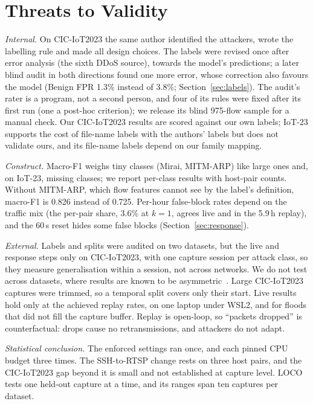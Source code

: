 \section{Threats to Validity}\label{sec:threats}

\emph{Internal.} On CIC-IoT2023 the same author identified the attackers, wrote the labelling rule and made all design choices. The labels were revised once after error analysis (the sixth DDoS source), towards the model's predictions; a later blind audit in both directions found one more error, whose correction also favours the model (Benign FPR 1.3\% instead of 3.8\%; Section~\ref{sec:labels}). The audit's rater is a program, not a second person, and four of its rules were fixed after its first run (one a post-hoc criterion); we release its blind 975-flow sample for a manual check. Our CIC-IoT2023 results are scored against our own labels; IoT-23 supports the cost of file-name labels with the authors' labels but does not validate ours, and its file-name labels depend on our family mapping.

\emph{Construct.} Macro-F1 weighs tiny classes (Mirai, MITM-ARP) like large ones and, on IoT-23, missing classes; we report per-class results with host-pair counts. Without MITM-ARP, which flow features cannot see by the label's definition, macro-F1 is 0.826 instead of 0.725. Per-hour false-block rates depend on the traffic mix (the per-pair share, 3.6\% at $k=1$, agrees live and in the 5.9\,h replay), and the 60\,s reset hides some false blocks (Section~\ref{sec:response}).

\emph{External.} Labels and splits were audited on two datasets, but the live and response steps only on CIC-IoT2023, with one capture session per attack class, so they measure generalisation within a session, not across networks. We do not test across datasets, where results are known to be asymmetric~\cite{ali2026siamxbert}. Large CIC-IoT2023 captures were trimmed, so a temporal split covers only their start. Live results hold only at the achieved replay rates, on one laptop under WSL2, and for floods that did not fill the capture buffer. Replay is open-loop, so ``packets dropped'' is counterfactual: drops cause no retransmissions, and attackers do not adapt.

\emph{Statistical conclusion.} The enforced settings ran once, and each pinned CPU budget three times. The SSH-to-RTSP change rests on three host pairs, and the CIC-IoT2023 gap beyond it is small and not established at capture level. LOCO tests one held-out capture at a time, and its ranges span ten captures per dataset.

